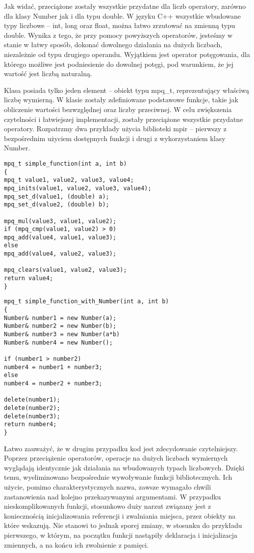 Jak widać, przeciążone zostały wszystkie przydatne dla liczb operatory, zarówno dla klasy Number jak i dla typu double. W języku C++ wszystkie wbudowane typy liczbowe -- int, long oraz float, można łatwo zrzutować na zmienną typu double. Wynika z tego, że przy pomocy powyższych operatorów, jesteśmy w stanie w łatwy sposób, dokonać dowolnego działania na dużych liczbach, niezależnie od typu drugiego operandu. Wyjątkiem jest operator potęgowania, dla którego możliwe jest podniesienie do dowolnej potęgi, pod warunkiem, że jej wartość jest liczbą naturalną.

Klasa posiada tylko jeden element – obiekt typu mpq\_t, reprezentujący właściwą liczbę wymierną. W klasie zostały zdefiniowane podstawowe funkcje, takie jak obliczenie wartości bezwzględnej oraz liczby przeciwnej. W celu zwiększenia czytelności i łatwiejszej implementacji, zostały przeciążone wszystkie przydatne operatory. Rozpatrzmy dwa przykłady użycia biblioteki mpir – pierwszy z bezpośrednim użyciem dostępnych funkcji i drugi z wykorzystaniem klasy Number.

\begin{lstlisting}
mpq_t simple_function(int a, int b)
{
mpq_t value1, value2, value3, value4;
mpq_inits(value1, value2, value3, value4);
mpq_set_d(value1, (double) a);
mpq_set_d(value2, (double) b);

mpq_mul(value3, value1, value2);
if (mpq_cmp(value1, value2) > 0)
mpq_add(value4, value1, value3);
else
mpq_add(value4, value2, value3);

mpq_clears(value1, value2, value3);
return value4;
}
\end{lstlisting}

\begin{lstlisting}
mpq_t simple_function_with_Number(int a, int b)
{
Number& number1 = new Number(a);
Number& number2 = new Number(b);
Number& number3 = new Number(a*b)
Number& number4 = new Number();

if (number1 > number2)
number4 = number1 + number3;
else
number4 = number2 + number3;

delete(number1);
delete(number2);
delete(number3);
return number4;
}
\end{lstlisting}

Łatwo zauważyć, że w drugim przypadku kod jest zdecydowanie czytelniejszy. Poprzez przeciążenie operatorów, operacje na dużych liczbach wymiernych wyglądają identycznie jak działania na wbudowanych typach liczbowych. Dzięki temu, wyeliminowano bezpośrednie wywoływanie funkcji bibliotecznych. Ich użycie, pomimo charakterystycznych nazwa, zawsze wymagało chwili zastanowienia nad kolejno przekazywanymi argumentami. W przypadku nieskomplikowanych funkcji, stosunkowo duży narzut związany jest z koniecznością inicjalizowania referencji i zwalniania miejsca, przez obiekty na które wskazują. Nie stanowi to jednak sporej zmiany, w stosunku do przykładu pierwszego, w którym, na początku funkcji nastąpiły deklaracja i inicjalizacja zmiennych, a na końcu ich zwolnienie z pamięci.

